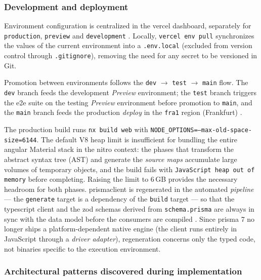 \subsubsection{Development and deployment}\label{subsec:dezvoltare-deploy}

Environment configuration is centralized in the \gls{vercel} dashboard, separately for \texttt{production}, \texttt{preview} and \texttt{development} \cite{vercel_cli}. Locally, \texttt{vercel env pull} synchronizes the values of the current environment into a \texttt{.env.local} (excluded from version control through \texttt{.gitignore}), removing the need for any secret to be versioned in Git.

Promotion between environments follows the \texttt{dev} \(\rightarrow\) \texttt{test} \(\rightarrow\) \texttt{main} flow. The \texttt{dev} branch feeds the development \textit{Preview} environment; the \texttt{test} branch triggers the \acrshort{e2e} suite on the testing \textit{Preview} environment before promotion to \texttt{main}, and the \texttt{main} branch feeds the production \textit{deploy} in the \texttt{fra1} region (Frankfurt) \cite{vercel_cli}.

The production build runs \texttt{nx build web} with \texttt{NODE\_OPTIONS=\allowbreak --max-old-space-size=6144}.
The default V8 heap limit is insufficient for bundling the entire \gls{angular} Material stack in the \gls{nitro} context: the phases that transform the abstract syntax tree (AST) and generate the \textit{source maps} accumulate large volumes of temporary objects, and the build fails with \texttt{JavaScript heap out of memory} before completing.
Raising the limit to 6\,GB provides the necessary headroom for both phases.
\gls{prismaclient} is regenerated in the automated \textit{pipeline} --- the \texttt{generate} target is a dependency of the \texttt{build} target --- so that the \gls{typescript} client and the \gls{zod} schemas derived from \texttt{schema.prisma} are always in sync with the data model before the consumers are compiled \cite{prisma_orm}. Since \gls{prisma} 7 no longer ships a platform-dependent native engine (the client runs entirely in JavaScript through a \textit{driver adapter}), regeneration concerns only the typed code, not binaries specific to the execution environment.

\subsubsection{Architectural patterns discovered during implementation}\label{subsec:pan-patterns}

